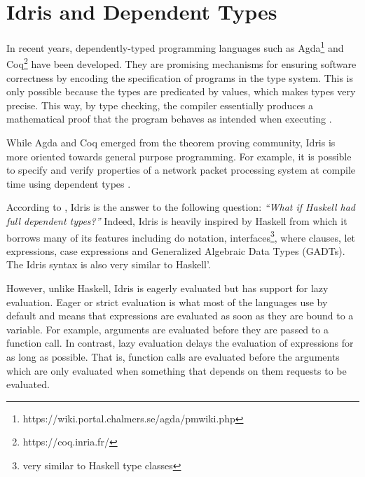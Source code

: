 \section{Idris and Dependent Types}
In recent years, dependently-typed programming languages such
as Agda\footnote{https://wiki.portal.chalmers.se/agda/pmwiki.php}
and Coq\footnote{https://coq.inria.fr/} have been developed.
They are promising mechanisms for ensuring software correctness
by encoding the specification of programs in the type system.
This is only possible because the types are predicated by values,
which makes types very precise.
This way, by type checking, the compiler essentially produces a
mathematical proof that the program behaves as intended when
executing \citep{brady_2013}.

While Agda and Coq emerged from the theorem proving community,
Idris is more oriented towards general purpose programming. For
example, it is possible to specify and verify properties of
a network packet processing system at compile time using
dependent types \citep{systemprog}.




According to \citep{brady_2013}, Idris is the answer to the following
question:
\emph{``What if Haskell had full dependent types?''}
Indeed, Idris is heavily inspired by Haskell from which it
borrows many of its features including do notation,
interfaces\footnote{very similar to Haskell type
    classes}, where clauses, let expressions, case expressions and
Generalized Algebraic Data Types (GADTs).
The Idris syntax is also very similar to Haskell'.

However, unlike Haskell, Idris is eagerly evaluated but has
support for lazy evaluation.
Eager or strict evaluation is what most of the languages
use by default and means that expressions are evaluated
as soon as they are bound to a variable.
For example, arguments are evaluated before they are passed
to a function call.
In contrast, lazy evaluation delays the evaluation of expressions for
as long as possible.
That is, function calls are evaluated before the arguments which
are only evaluated when something that depends on them requests to
be evaluated.


